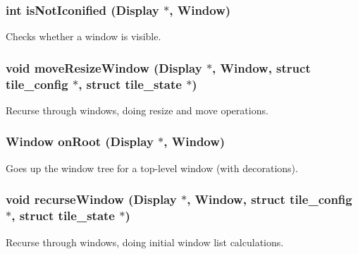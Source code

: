 \subsubsection{\setlength{\rightskip}{0pt plus 5cm}int is\-Not\-Iconified (Display $\ast$, Window)}\label{x11_8h_a6}


Checks whether a window is visible. 

\subsubsection{\setlength{\rightskip}{0pt plus 5cm}void move\-Resize\-Window (Display $\ast$, Window, struct {\bf tile\_\-config} $\ast$, struct {\bf tile\_\-state} $\ast$)}\label{x11_8h_a8}


Recurse through windows, doing resize and move operations. 

\subsubsection{\setlength{\rightskip}{0pt plus 5cm}Window on\-Root (Display $\ast$, Window)}\label{x11_8h_a4}


Goes up the window tree for a top-level window (with decorations). 

\subsubsection{\setlength{\rightskip}{0pt plus 5cm}void recurse\-Window (Display $\ast$, Window, struct {\bf tile\_\-config} $\ast$, struct {\bf tile\_\-state} $\ast$)}\label{x11_8h_a7}


Recurse through windows, doing initial window list calculations. 

